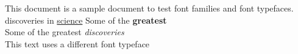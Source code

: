 \documentclass{article}
\begin{document}
This document is a sample document to test font families and font typefaces.
discoveries in \underline{science} 
Some of the \textbf{greatest} \\
Some of the greatest \emph{discoveries} \\
This text uses a different font typeface
\end{document}
